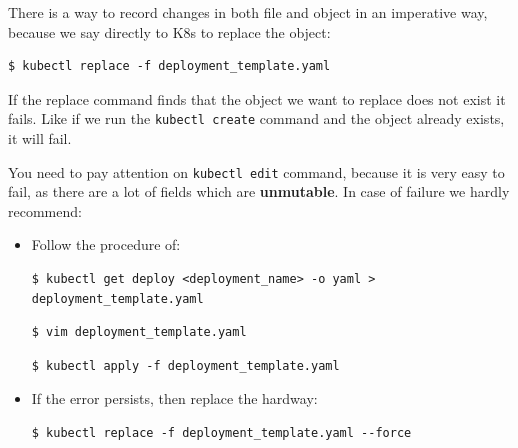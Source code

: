 \documentclass{article}
\newenvironment{blocktemplateII}[1]{%
    \tcolorbox[beamer,%
    noparskip,breakable,
    colframe=Green,%
    colbacklower=LimeGreen!75!LightGreen,%
    title=#1]}%
    {\endtcolorbox}
\newenvironment{blocktemplateIII}[1]{%
    \tcolorbox[beamer,%
    noparskip,breakable,
    ,colframe=Red,%
    colbacklower=LimeGreen!75!LightGreen,%
    title=#1]}%
    {\endtcolorbox}
\newenvironment{codetemplate}[1][]{%
  \mybasecolorbox[#1]
  \itshape
}{%
  \endmybasecolorbox
}
\begin{document}
\begin{blocktemplateII}{NOTE}
There is a way to record changes in both file and object in an imperative way, because we say directly to K8s to replace the object:
\begin{codetemplate}{}
\begin{verbatim}
$ kubectl replace -f deployment_template.yaml
\end{verbatim}
\end{codetemplate}
If the replace command finds that the object we want to replace does not exist it fails. Like if we run the \verb|kubectl create| command and the object already exists, it will fail.
\end{blocktemplateII}

\begin{blocktemplateIII}{WARNING}
You need to pay attention on \verb|kubectl edit| command, because it is very easy to fail, as there are a lot of fields which are \textbf{unmutable}. In case of failure we hardly recommend:
\begin{itemize}
    \item Follow the procedure of:
\begin{codetemplate}{}
\begin{verbatim}
$ kubectl get deploy <deployment_name> -o yaml > deployment_template.yaml
\end{verbatim}
\end{codetemplate}
\begin{codetemplate}{}
\begin{verbatim}
$ vim deployment_template.yaml
\end{verbatim}
\end{codetemplate}
\begin{codetemplate}{}
\begin{verbatim}
$ kubectl apply -f deployment_template.yaml
\end{verbatim}
\end{codetemplate}

    \item If the error persists, then replace the hardway:
\begin{codetemplate}{}
\begin{verbatim}
$ kubectl replace -f deployment_template.yaml --force
\end{verbatim}
\end{codetemplate}
\end{itemize}
\end{blocktemplateIII}
\end{document}
